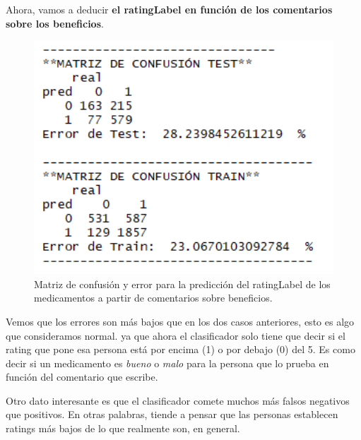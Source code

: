 \documentclass[spanish,]{article}
\newenvironment{Shaded}{\begin{snugshade}}{\end{snugshade}}
\newcommand{\KeywordTok}[1]{\textcolor[rgb]{0.13,0.29,0.53}{\textbf{#1}}}
\newcommand{\OperatorTok}[1]{\textcolor[rgb]{0.81,0.36,0.00}{\textbf{#1}}}
\newcommand{\NormalTok}[1]{#1}
\begin{document}
\newpage

Ahora, vamos a deducir \textbf{el ratingLabel en función de los
comentarios sobre los beneficios}.

\begin{Shaded}
\end{Shaded}

\begin{figure}[h]
    \centering
    \includegraphics[width=1\textwidth]{figuras/Bayes/benefits_ratingLabel.png}
    \caption{Matriz de confusión y error para la predicción del ratingLabel de los medicamentos a partir de comentarios sobre beneficios.}
    \label{fig:bayes:figura3}
\end{figure}

Vemos que los errores son más bajos que en los dos casos anteriores,
esto es algo que consideramos normal. ya que ahora el clasificador solo
tiene que decir si el rating que pone esa persona está por encima (1) o
por debajo (0) del 5. Es como decir si un medicamento es \emph{bueno} o
\emph{malo} para la persona que lo prueba en función del comentario que
escribe.

Otro dato interesante es que el clasificador comete muchos más falsos
negativos que positivos. En otras palabras, tiende a pensar que las
personas establecen ratings más bajos de lo que realmente son, en
general.
\end{document}
